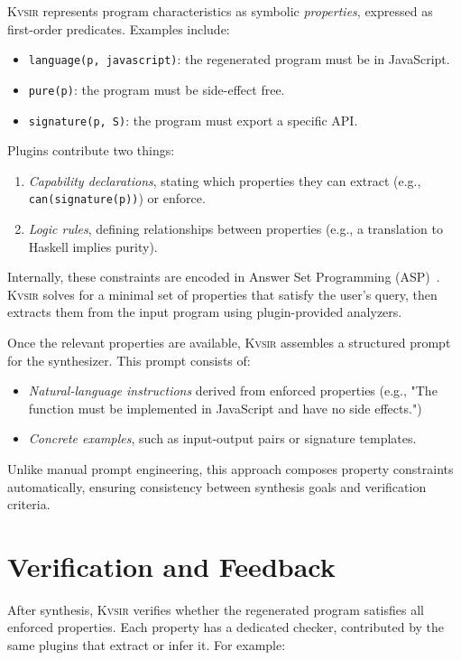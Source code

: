 \documentclass[sigplan,review,anonymous,10pt]{acmart}
\newcommand{\sys}{{\scshape Kv{\textalpha}sir}\xspace}
\begin{document}
\sys represents program characteristics as symbolic \emph{properties}, expressed as first-order predicates. Examples include:

\begin{itemize}
  \item \texttt{language(p, javascript)}: the regenerated program must be in JavaScript.
  \item \texttt{pure(p)}: the program must be side-effect free.
  \item \texttt{signature(p, S)}: the program must export a specific API.
\end{itemize}

Plugins contribute two things:
\begin{enumerate}
  \item \emph{Capability declarations}, stating which properties they can extract (e.g., \texttt{can(signature(p))}) or enforce.
  \item \emph{Logic rules}, defining relationships between properties (e.g., a translation to Haskell implies purity).
\end{enumerate}

Internally, these constraints are encoded in Answer Set Programming (ASP)~\cite{Gelfond_2000, Eiter_2009}. \sys solves for a minimal set of properties that satisfy the user’s query, then extracts them from the input program using plugin-provided analyzers.

Once the relevant properties are available, \sys assembles a structured prompt for the synthesizer. This prompt consists of:

\begin{itemize}
  \item \emph{Natural-language instructions} derived from enforced properties (e.g., "The function must be implemented in JavaScript and have no side effects.")
  \item \emph{Concrete examples}, such as input-output pairs or signature templates.
\end{itemize}

Unlike manual prompt engineering, this approach composes property constraints automatically, ensuring consistency between synthesis goals and verification criteria.

\section{Verification and Feedback}
\label{sec:verification}

After synthesis, \sys verifies whether the regenerated program satisfies all
enforced properties. Each property has a dedicated checker, contributed by the
same plugins that extract or infer it. For example:
\end{document}
